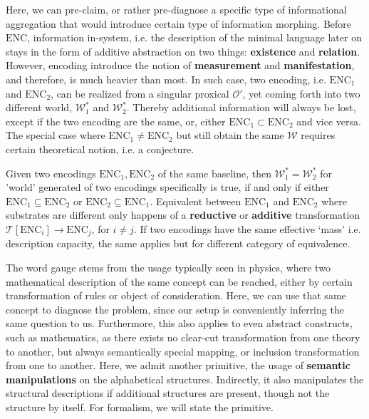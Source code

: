 Here, we can pre-claim, or rather pre-diagnose a specific type of informational aggregation that would introduce certain type of information morphing. Before $\mathrm{ENC}$, information in-system, i.e. the description of the minimal language later on stays in the form of additive abstraction on two things: \textbf{existence} and \textbf{relation}. However, encoding introduce the notion of \textbf{measurement} and \textbf{manifestation}, and therefore, is much heavier than most. In such case, two encoding, i.e. $\mathrm{ENC}_{1}$ and $\mathrm{ENC}_{2}$, can be realized from a singular proxical $\mathcal{O}'$, yet coming forth into two different world, $\mathcal{W}^{*}_{1}$ and $\mathcal{W}^{*}_{2}$. Thereby additional information will always be lost, except if the two encoding are the same, or, either $\mathrm{ENC}_{1}\subset \mathrm{ENC}_{2}$ and vice versa. The special case where $\mathrm{ENC}_{1}\neq \mathrm{ENC}_{2}$ but still obtain the same $\mathcal{W}$ requires certain theoretical notion, i.e. a conjecture. 

\begin{conjecture}[Gauge]
	Given two encodings $\mathrm{ENC}_{1},\mathrm{ENC}_{2}$ of the same baseline, then $\mathcal{W}_{1}^{*}=\mathcal{W}^{*}_{2}$ for 'world' generated of two encodings specifically is true, if and only if either $\mathrm{ENC}_{1}\subseteq\mathrm{ENC}_{2}$ or $\mathrm{ENC}_{2}\subseteq\mathrm{ENC}_{1}$. Equivalent between $\mathrm{ENC}_{1}$ and $\mathrm{ENC}_{2}$ where substrates are different only happens of a \textbf{reductive} or \textbf{additive} transformation $\mathcal{T}[\mathrm{ENC}_{i}]\to \mathrm{ENC}_{j}$, for $i\neq j$. If two encodings have the same effective `mass' i.e. description capacity, the same applies but for different category of equivalence. 
\end{conjecture}

The word gauge stems from the usage typically seen in physics, where two mathematical description of the same concept can be reached, either by certain transformation of rules or object of consideration. Here, we can use that same concept to diagnose the problem, since our setup is conveniently inferring the same question to us. Furthermore, this also applies to even abstract constructs, such as mathematics, as there exists no clear-cut transformation from one theory to another, but always semantically special mapping, or inclusion transformation from one to another. Here, we admit another primitive, the usage of \textbf{semantic manipulations} on the alphabetical structures. Indirectly, it also manipulates the structural descriptions if additional structures are present, though not the structure by itself. For formalism, we will state the primitive. 

